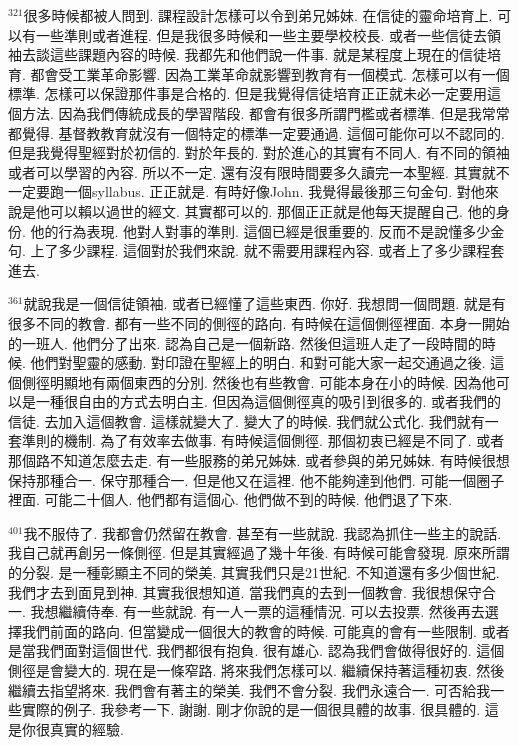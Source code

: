 \documentclass{book}
\begin{document}
$^{321}$很多時候都被人問到.
課程設計怎樣可以令到弟兄姊妹.
在信徒的靈命培育上.
可以有一些準則或者進程.
但是我很多時候和一些主要學校校長.
或者一些信徒去領袖去談這些課題內容的時候.
我都先和他們說一件事.
就是某程度上現在的信徒培育.
都會受工業革命影響.
因為工業革命就影響到教育有一個模式.
怎樣可以有一個標準.
怎樣可以保證那件事是合格的.
但是我覺得信徒培育正正就未必一定要用這個方法.
因為我們傳統成長的學習階段.
都會有很多所謂門檻或者標準.
但是我常常都覺得.
基督教教育就沒有一個特定的標準一定要通過.
這個可能你可以不認同的.
但是我覺得聖經對於初信的.
對於年長的.
對於進心的其實有不同人.
有不同的領袖或者可以學習的內容.
所以不一定.
還有沒有限時間要多久讀完一本聖經.
其實就不一定要跑一個syllabus.
正正就是.
有時好像John.
我覺得最後那三句金句.
對他來說是他可以賴以過世的經文.
其實都可以的.
那個正正就是他每天提醒自己.
他的身份.
他的行為表現.
他對人對事的準則.
這個已經是很重要的.
反而不是說懂多少金句.
上了多少課程.
這個對於我們來說.
就不需要用課程內容.
或者上了多少課程套進去.

$^{361}$就說我是一個信徒領袖.
或者已經懂了這些東西.
你好.
我想問一個問題.
就是有很多不同的教會.
都有一些不同的側徑的路向.
有時候在這個側徑裡面.
本身一開始的一班人.
他們分了出來.
認為自己是一個新路.
然後但這班人走了一段時間的時候.
他們對聖靈的感動.
對印證在聖經上的明白.
和對可能大家一起交通過之後.
這個側徑明顯地有兩個東西的分別.
然後也有些教會.
可能本身在小的時候.
因為他可以是一種很自由的方式去明白主.
但因為這個側徑真的吸引到很多的.
或者我們的信徒.
去加入這個教會.
這樣就變大了.
變大了的時候.
我們就公式化.
我們就有一套準則的機制.
為了有效率去做事.
有時候這個側徑.
那個初衷已經是不同了.
或者那個路不知道怎麼去走.
有一些服務的弟兄姊妹.
或者參與的弟兄姊妹.
有時候很想保持那種合一.
保守那種合一.
但是他又在這裡.
他不能夠達到他們.
可能一個圈子裡面.
可能二十個人.
他們都有這個心.
他們做不到的時候.
他們退了下來.

$^{401}$我不服侍了.
我都會仍然留在教會.
甚至有一些就說.
我認為抓住一些主的說話.
我自己就再創另一條側徑.
但是其實經過了幾十年後.
有時候可能會發現.
原來所謂的分裂.
是一種彰顯主不同的榮美.
其實我們只是21世紀.
不知道還有多少個世紀.
我們才去到面見到神.
其實我很想知道.
當我們真的去到一個教會.
我很想保守合一.
我想繼續侍奉.
有一些就說.
有一人一票的這種情況.
可以去投票.
然後再去選擇我們前面的路向.
但當變成一個很大的教會的時候.
可能真的會有一些限制.
或者是當我們面對這個世代.
我們都很有抱負.
很有雄心.
認為我們會做得很好的.
這個側徑是會變大的.
現在是一條窄路.
將來我們怎樣可以.
繼續保持著這種初衷.
然後繼續去指望將來.
我們會有著主的榮美.
我們不會分裂.
我們永遠合一.
可否給我一些實際的例子.
我參考一下.
謝謝.
剛才你說的是一個很具體的故事.
很具體的.
這是你很真實的經驗.
\end{document}
